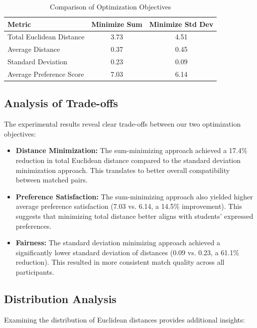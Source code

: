 \documentclass[10pt,journal,compsoc]{IEEEtran}
\begin{document}
\begin{table}[!t]
\caption{Comparison of Optimization Objectives}
\label{tab:results}
\centering
\begin{tabular}{lcc}
\toprule
\textbf{Metric} & \textbf{Minimize Sum} & \textbf{Minimize Std Dev} \\
\midrule
Total Euclidean Distance & 3.73 & 4.51 \\
Average Distance & 0.37 & 0.45 \\
Standard Deviation & 0.23 & 0.09 \\
Average Preference Score & 7.03 & 6.14 \\
\bottomrule
\end{tabular}
\end{table}

\subsection{Analysis of Trade-offs}

The experimental results reveal clear trade-offs between our two optimization objectives:

\begin{itemize}
\item \textbf{Distance Minimization:} The sum-minimizing approach achieved a 17.4\% reduction in total Euclidean distance compared to the standard deviation minimization approach. This translates to better overall compatibility between matched pairs.

\item \textbf{Preference Satisfaction:} The sum-minimizing approach also yielded higher average preference satisfaction (7.03 vs. 6.14, a 14.5\% improvement). This suggests that minimizing total distance better aligns with students' expressed preferences.

\item \textbf{Fairness:} The standard deviation minimizing approach achieved a significantly lower standard deviation of distances (0.09 vs. 0.23, a 61.1\% reduction). This resulted in more consistent match quality across all participants.
\end{itemize}

\subsection{Distribution Analysis}

Examining the distribution of Euclidean distances provides additional insights:
\end{document}
